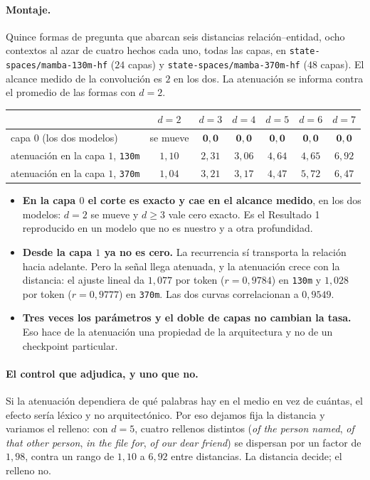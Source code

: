 \documentclass[11pt,a4paper]{article}
\begin{document}
\paragraph{Montaje.} Quince formas de pregunta que abarcan seis distancias relación--entidad, ocho
contextos al azar de cuatro hechos cada uno, todas las capas, en \texttt{state-spaces/mamba-130m-hf}
($24$ capas) y \texttt{state-spaces/mamba-370m-hf} ($48$ capas). El alcance medido de la convolución
es $2$ en los dos. La atenuación se informa contra el promedio de las formas con $d{=}2$.

\begin{center}
\begin{tabular}{lcccccc}
\toprule
& $d{=}2$ & $d{=}3$ & $d{=}4$ & $d{=}5$ & $d{=}6$ & $d{=}7$ \\
\midrule
capa $0$ (los dos modelos) & se mueve & $\mathbf{0{,}0}$ & $\mathbf{0{,}0}$ & $\mathbf{0{,}0}$ & $\mathbf{0{,}0}$ & $\mathbf{0{,}0}$ \\
\midrule
atenuación en la capa $1$, \texttt{130m} & $1{,}10$ & $2{,}31$ & $3{,}06$ & $4{,}64$ & $4{,}65$ & $6{,}92$ \\
atenuación en la capa $1$, \texttt{370m} & $1{,}04$ & $3{,}21$ & $3{,}17$ & $4{,}47$ & $5{,}72$ & $6{,}47$ \\
\bottomrule
\end{tabular}
\end{center}

\begin{itemize}
\item \textbf{En la capa $0$ el corte es exacto y cae en el alcance medido}, en los dos modelos:
$d{=}2$ se mueve y $d \ge 3$ vale cero exacto. Es el Resultado 1 reproducido en un modelo que no es
nuestro y a otra profundidad.
\item \textbf{Desde la capa $1$ ya no es cero.} La recurrencia sí transporta la relación hacia
adelante. Pero la señal llega atenuada, y la atenuación crece con la distancia: el ajuste lineal da
$1{,}077$ por token ($r = 0{,}9784$) en \texttt{130m} y $1{,}028$ por token ($r = 0{,}9777$) en
\texttt{370m}. Las dos curvas correlacionan a $0{,}9549$.
\item \textbf{Tres veces los parámetros y el doble de capas no cambian la tasa.} Eso hace de la
atenuación una propiedad de la arquitectura y no de un checkpoint particular.
\end{itemize}

\paragraph{El control que adjudica, y uno que no.} Si la atenuación dependiera de qué palabras hay en
el medio en vez de cuántas, el efecto sería léxico y no arquitectónico. Por eso dejamos fija la
distancia y variamos el relleno: con $d{=}5$, cuatro rellenos distintos (\emph{of the person named},
\emph{of that other person}, \emph{in the file for}, \emph{of our dear friend}) se dispersan por un
factor de $1{,}98$, contra un rango de $1{,}10$ a $6{,}92$ entre distancias. La distancia decide; el
relleno no.
\end{document}
